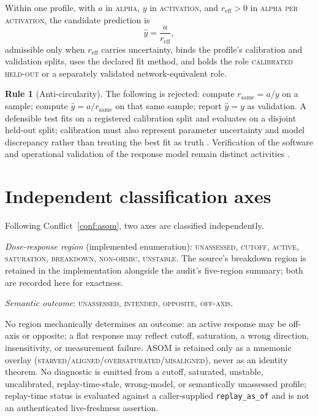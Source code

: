 \documentclass[11pt]{amsart}
\theoremstyle{definition}
\newtheorem{ruleenv}[theorem]{Rule}
\theoremstyle{remark}
\begin{document}
Within one profile, with $a$ in \textsc{alpha}, $y$ in \textsc{activation}, and $r_{\mathrm{eff}}>0$ in \textsc{alpha per activation}, the candidate prediction is
\[
\hat y=\frac{a}{r_{\mathrm{eff}}},
\]
admissible only when $r_{\mathrm{eff}}$ carries uncertainty, binds the profile's calibration and validation splits, uses the declared fit method, and holds the role \textsc{calibrated held-out} or a separately validated network-equivalent role.

\begin{ruleenv}[Anti-circularity]\label{rule:circular}
The following is rejected: compute $r_{\mathrm{same}}=a/y$ on a sample; compute $\hat y=a/r_{\mathrm{same}}$ on that same sample; report $\hat y=y$ as validation. A defensible test fits on a registered calibration split and evaluates on a disjoint held-out split; calibration must also represent parameter uncertainty and model discrepancy rather than treating the best fit as truth \cite{kennedyohagan}. Verification of the software and operational validation of the response model remain distinct activities \cite{sargent}.
\end{ruleenv}

\section{Independent classification axes}\label{sec:class}

Following Conflict~\ref{conf:asom}, two axes are classified independently.

\emph{Dose-response region} (implemented enumeration): \textsc{unassessed}, \textsc{cutoff}, \textsc{active}, \textsc{saturation}, \textsc{breakdown}, \textsc{non-ohmic}, \textsc{unstable}. The source's breakdown region is retained in the implementation alongside the audit's five-region summary; both are recorded here for exactness.

\emph{Semantic outcome}: \textsc{unassessed}, \textsc{intended}, \textsc{opposite}, \textsc{off-axis}.

No region mechanically determines an outcome: an active response may be off-axis or opposite; a flat response may reflect cutoff, saturation, a wrong direction, insensitivity, or measurement failure. ASOM is retained only as a mnemonic overlay (\textsc{starved}/\textsc{aligned}/\textsc{oversaturated}/\textsc{misaligned}), never as an identity theorem. No diagnostic is emitted from a cutoff, saturated, unstable, uncalibrated, replay-time-stale, wrong-model, or semantically unassessed profile; replay-time status is evaluated against a caller-supplied \texttt{replay\_as\_of} and is not an authenticated live-freshness assertion.
\end{document}
